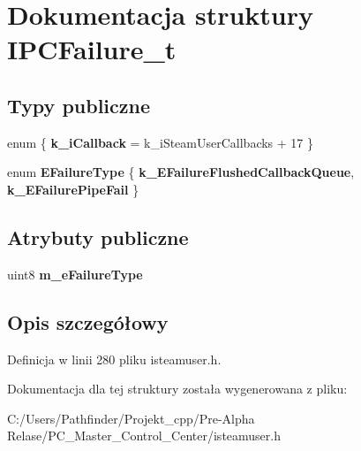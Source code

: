 \hypertarget{struct_i_p_c_failure__t}{}\section{Dokumentacja struktury I\+P\+C\+Failure\+\_\+t}
\label{struct_i_p_c_failure__t}
\subsection*{Typy publiczne}
\begin{DoxyCompactItemize}
\item 
\mbox{\label{struct_i_p_c_failure__t_a557414c76d95470d3ced8349832f6db5}} 
enum \{ {\bfseries k\+\_\+i\+Callback} = k\+\_\+i\+Steam\+User\+Callbacks + 17
 \}
\item 
\mbox{\label{struct_i_p_c_failure__t_afc8deaf00f819b1527a7ab4e557a1513}} 
enum {\bfseries E\+Failure\+Type} \{ {\bfseries k\+\_\+\+E\+Failure\+Flushed\+Callback\+Queue}, 
{\bfseries k\+\_\+\+E\+Failure\+Pipe\+Fail}
 \}
\end{DoxyCompactItemize}
\subsection*{Atrybuty publiczne}
\begin{DoxyCompactItemize}
\item 
\mbox{\label{struct_i_p_c_failure__t_adc2e58d1387153ff30dfd42f5fffbf44}} 
uint8 {\bfseries m\+\_\+e\+Failure\+Type}
\end{DoxyCompactItemize}


\subsection{Opis szczegółowy}


Definicja w linii 280 pliku isteamuser.\+h.



Dokumentacja dla tej struktury została wygenerowana z pliku\+:\begin{DoxyCompactItemize}
\item 
C\+:/\+Users/\+Pathfinder/\+Projekt\+\_\+cpp/\+Pre-\/\+Alpha Relase/\+P\+C\+\_\+\+Master\+\_\+\+Control\+\_\+\+Center/isteamuser.\+h\end{DoxyCompactItemize}
